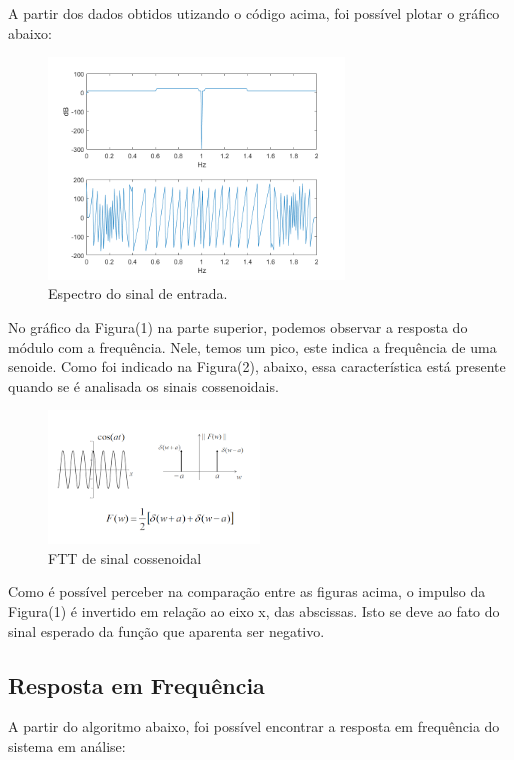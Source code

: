\documentclass[12pt]{article}
\begin{document}
\quad A partir dos dados obtidos utizando o código acima, foi possível plotar o gráfico abaixo:

\begin{figure}[H] 
    \centering
    \includegraphics[width=0.7\textwidth]{Gráfico01.png}
    \caption{Espectro do sinal de entrada.}
    \label{fig:mesh2}
\end{figure}

\quad No gráfico da Figura(1) na parte superior, podemos observar a resposta do módulo com a frequência. Nele, temos um pico, este indica a frequência de uma senoide. Como foi indicado na Figura(2), abaixo, essa característica está presente quando se é analisada os sinais cossenoidais.

\begin{figure}[H] 
    \centering
    \includegraphics[width=0.5\textwidth]{funçãocos.png}
    \caption{FTT de sinal cossenoidal}
    \label{fig:mesh2}
\end{figure}

\par Como é possível perceber na comparação entre as figuras acima, o impulso da Figura(1) é invertido em relação ao eixo x, das abscissas. Isto se deve ao fato do sinal esperado da função que aparenta ser negativo.

\subsection{Resposta em Frequência}
\quad A partir do algoritmo abaixo, foi possível encontrar a resposta em frequência do sistema em análise:
\end{document}
